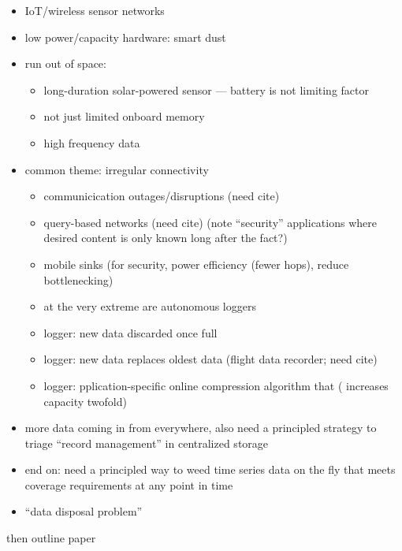 \begin{itemize}
  \item IoT/wireless sensor networks
  \item low power/capacity hardware: smart dust \citep{warneke2001smart}
  \item run out of space:
  \begin{itemize}
    \item long-duration solar-powered sensor --- battery is not limiting factor \citep{corke2007long}
    \item not just limited onboard memory
    \item high frequency data \citep{luharuka2003design}
  \end{itemize}
  \item common theme: irregular connectivity
  \begin{itemize}
    \item communicication outages/disruptions (need cite)
    \item query-based networks (need cite) (note ``security'' applications where desired content is only known long after the fact?)
    \item mobile sinks \citep{jain2022survey} (for security, power efficiency (fewer hops), reduce bottlenecking)
    \item at the very extreme are autonomous loggers
    \item logger: new data discarded once full \citep{saunders1989portable,mahzan2017design}
    \item logger: new data replaces oldest data (flight data recorder; need cite)
    \item logger: pplication-specific online compression algorithm that (\citep{hadiatna2016design} increases capacity twofold)
  \end{itemize}
  \item more data coming in from everywhere, also need a principled strategy to triage ``record management'' in centralized storage
  \item end on: need a principled way to weed time series data on the fly that meets coverage requirements at any point in time
  \item ``data disposal problem''
\end{itemize}

then outline paper
